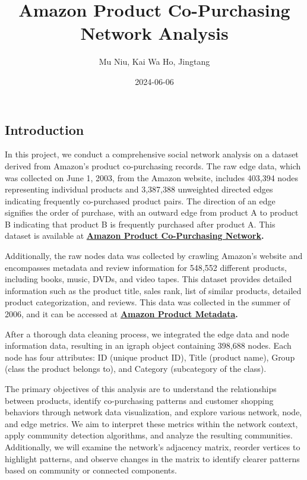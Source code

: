\documentclass[
]{article}
\title{Amazon Product Co-Purchasing Network Analysis}
\author{Mu Niu, Kai Wa Ho, Jingtang}
\date{2024-06-06}
\begin{document}
\maketitle

\subsection{Introduction}\label{introduction}

In this project, we conduct a comprehensive social network analysis on a
dataset derived from Amazon's product co-purchasing records. The raw
edge data, which was collected on June 1, 2003, from the Amazon website,
includes 403,394 nodes representing individual products and 3,387,388
unweighted directed edges indicating frequently co-purchased product
pairs. The direction of an edge signifies the order of purchase, with an
outward edge from product A to product B indicating that product B is
frequently purchased after product A. This dataset is available at
\href{https://snap.stanford.edu/data/amazon0601.html}{\textbf{Amazon
Product Co-Purchasing Network}}\textbf{.}

Additionally, the raw nodes data was collected by crawling Amazon's
website and encompasses metadata and review information for 548,552
different products, including books, music, DVDs, and video tapes. This
dataset provides detailed information such as the product title, sales
rank, list of similar products, detailed product categorization, and
reviews. This data was collected in the summer of 2006, and it can be
accessed at
\href{https://snap.stanford.edu/data/amazon-meta.html}{\textbf{Amazon
Product Metadata}}\textbf{.}

After a thorough data cleaning process, we integrated the edge data and
node information data, resulting in an igraph object containing 398,688
nodes. Each node has four attributes: ID (unique product ID), Title
(product name), Group (class the product belongs to), and Category
(subcategory of the class).

The primary objectives of this analysis are to understand the
relationships between products, identify co-purchasing patterns and
customer shopping behaviors through network data visualization, and
explore various network, node, and edge metrics. We aim to interpret
these metrics within the network context, apply community detection
algorithms, and analyze the resulting communities. Additionally, we will
examine the network's adjacency matrix, reorder vertices to highlight
patterns, and observe changes in the matrix to identify clearer patterns
based on community or connected components.
\end{document}
